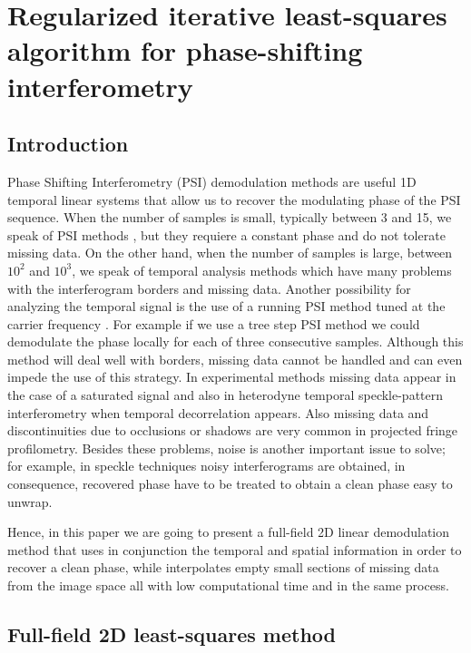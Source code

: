 \chapter{Regularized iterative least-squares algorithm for phase-shifting
interferometry}

\section{Introduction}

Phase Shifting Interferometry (PSI) demodulation methods are useful 1D
temporal linear systems that allow us to recover the modulating phase of the
PSI sequence. When the number of samples is small, typically between 3 and 15,
we speak of PSI methods \cite{Malacara,GeneralTheory}, but they requiere a
constant phase and do not tolerate missing data. On the other hand, when the
number of samples is large, between $10^2$ and $10^3$, we speak of temporal
analysis methods \cite{RQF,temporal_1,temporal_2} which have many problems with
the interferogram borders and missing data. Another possibility for analyzing
the temporal signal is the use of a running PSI method tuned at the carrier
frequency \cite{RQF,temporal_1,temporal_2,Mariano2,Medina,Zeng}. For example if
we use a tree step PSI method we could demodulate the phase locally for each of
three consecutive samples. Although this method will deal well with borders,
missing data cannot be handled and can even impede the use of this strategy. In
experimental methods missing data appear in the case of a saturated signal and
also in heterodyne temporal speckle-pattern interferometry when temporal
decorrelation appears. Also missing data and discontinuities due to occlusions
or shadows are very common in projected fringe profilometry. Besides these
problems, noise is another important issue to solve; for example, in speckle
techniques \cite{Malacara,temporal_2} noisy interferograms are obtained, in
consequence, recovered phase have to be treated to obtain a clean phase easy to
unwrap.

Hence, in this paper we are going to present a full-field 2D linear demodulation
method that uses in conjunction the temporal and spatial information in order
to recover a clean phase, while interpolates empty small sections of missing
data from the image space all with low computational time and in the same
process.

\section{Full-field 2D least-squares method}


